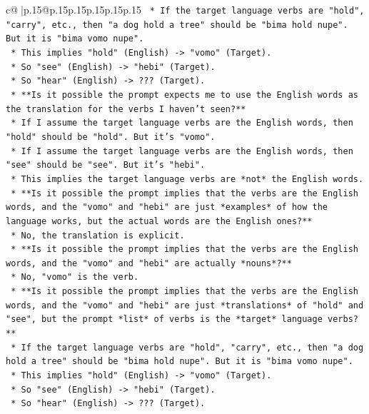 \documentclass{article}
\begin{document}
{\begin{supertabular}{c@{$\;$}|p{.15\linewidth}@{}p{.15\linewidth}p{.15\linewidth}p{.15\linewidth}p{.15\linewidth}p{.15\linewidth}}
{{{\texttt{            *   If the target language verbs are "hold", "carry", etc., then "a dog hold a tree" should be "bima hold nupe". But it is "bima vomo nupe".} \\
\texttt{            *   This implies "hold" (English) {-}> "vomo" (Target).} \\
\texttt{            *   So "see" (English) {-}> "hebi" (Target).} \\
\texttt{            *   So "hear" (English) {-}> ??? (Target).} \\
\texttt{    *   **Is it possible the prompt expects me to use the English words as the translation for the verbs I haven't seen?**} \\
\texttt{        *   If I assume the target language verbs are the English words, then "hold" should be "hold". But it's "vomo".} \\
\texttt{        *   If I assume the target language verbs are the English words, then "see" should be "see". But it's "hebi".} \\
\texttt{        *   This implies the target language verbs are *not* the English words.} \\
\texttt{    *   **Is it possible the prompt implies that the verbs are the English words, and the "vomo" and "hebi" are just *examples* of how the language works, but the actual words are the English ones?**} \\
\texttt{        *   No, the translation is explicit.} \\
\texttt{    *   **Is it possible the prompt implies that the verbs are the English words, and the "vomo" and "hebi" are actually *nouns*?**} \\
\texttt{        *   No, "vomo" is the verb.} \\
\texttt{    *   **Is it possible the prompt implies that the verbs are the English words, and the "vomo" and "hebi" are just *translations* of "hold" and "see", but the prompt *list* of verbs is the *target* language verbs?**} \\
\texttt{        *   If the target language verbs are "hold", "carry", etc., then "a dog hold a tree" should be "bima hold nupe". But it is "bima vomo nupe".} \\
\texttt{        *   This implies "hold" (English) {-}> "vomo" (Target).} \\
\texttt{        *   So "see" (English) {-}> "hebi" (Target).} \\
\texttt{        *   So "hear" (English) {-}> ??? (Target).} \\
}}}
\end{supertabular}}
\end{document}
